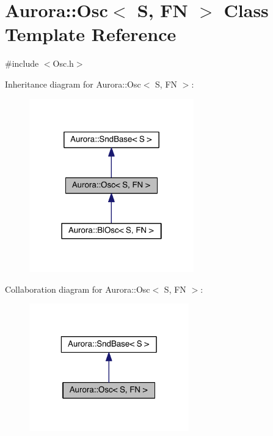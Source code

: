 \hypertarget{class_aurora_1_1_osc}{}\section{Aurora\+:\+:Osc$<$ S, FN $>$ Class Template Reference}
\label{class_aurora_1_1_osc}


{\ttfamily \#include $<$Osc.\+h$>$}



Inheritance diagram for Aurora\+:\+:Osc$<$ S, FN $>$\+:\nopagebreak
\begin{figure}[H]
\begin{center}
\leavevmode
\includegraphics[width=202pt]{class_aurora_1_1_osc__inherit__graph}
\end{center}
\end{figure}


Collaboration diagram for Aurora\+:\+:Osc$<$ S, FN $>$\+:\nopagebreak
\begin{figure}[H]
\begin{center}
\leavevmode
\includegraphics[width=196pt]{class_aurora_1_1_osc__coll__graph}
\end{center}
\end{figure}
